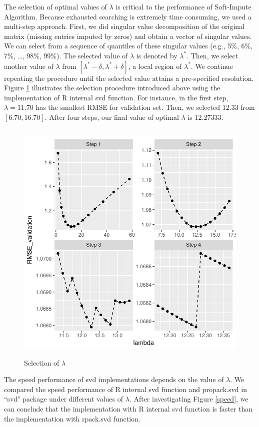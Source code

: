 \documentclass[12pt]{article}
\begin{document}
The selection of optimal values of $\lambda$ is critical to the performance of Soft-Impute Algorithm. Because exhausted searching is extremely time consuming, we used a multi-step approach. First, we did singular value decomposition of the original matrix (missing entries imputed by zeros) and obtain a vector of singular values. We can select from a sequence of quantiles of these singular values (e.g., 5\%, 6\%, 7\%, \ldots, 98\%, 99\%). The selected value of $\lambda$ is denoted by $\lambda^{*}$. Then, we select another value of $\lambda$ from $[\lambda^{*}-\delta, \lambda^{*}+\delta]$, a local region of $\lambda^{*}$. We continue repeating the procedure until the selected value attains a pre-specified resolution. Figure \ref{lambda} illustrates the selection procedure introduced above using the implementation of R internal svd function. For instance, in the first step, $\lambda = 11.70$ has the smallest RMSE for validation set. Then, we selected $12.33$ from $[6.70, 16.70]$. After four steps, our final value of optimal $\lambda$ is $12.27333$.

\begin{figure}[ht]
	\includegraphics[width=16cm,height=12cm]{movie}
	\caption{Selection of $\lambda$}\label{lambda}
\end{figure}

The speed performance of svd implementations depends on the value of $\lambda$. We compared the speed performance of R internal svd function and propack.svd in ``svd" package under different values of $\lambda$. After investigating Figure \ref{speed}, we can conclude that the implementation with R internal svd function is faster than the implementation with rpack.svd function.
\end{document}
